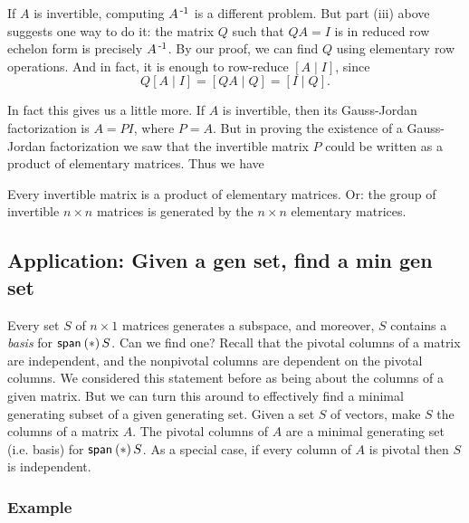 \documentclass{memoir}
\begin{document}
If $A$ is invertible, computing $A^{{\,\text{-}1}}$ is a different problem. But part (iii) above suggests one way to do it: the matrix $Q$ such that $QA = I$ is in reduced row echelon form is precisely $A^{{\,\text{-}1}}$. By our proof, we can find $Q$ using elementary row operations. And in fact, it is enough to row-reduce $[A \mid I]$, since \[ Q[A \mid I] = [QA \mid Q] = [I \mid Q]. \]

In fact this gives us a little more. If $A$ is invertible, then its Gauss-Jordan factorization is $A = PI$, where $P = A$. But in proving the existence of a Gauss-Jordan factorization we saw that the invertible matrix $P$ could be written as a product of elementary matrices. Thus we have

\begin{cor}
Every invertible matrix is a product of elementary matrices. Or: the group of invertible $n \times n$ matrices is generated by the $n \times n$ elementary matrices.
\end{cor}

\subsection*{Application: Given a gen set, find a min gen set}

Every set $S$ of $n \times 1$ matrices generates a subspace, and moreover, $S$ contains a \emph{basis} for $\operatorname{\mathsf{span}}_{}\left(*\right){S}$. Can we find one? Recall that the pivotal columns of a matrix are independent, and the nonpivotal columns are dependent on the pivotal columns. We considered this statement before as being about the columns of a given matrix. But we can turn this around to effectively find a minimal generating subset of a given generating set. Given a set $S$ of vectors, make $S$ the columns of a matrix $A$. The pivotal columns of $A$ are a minimal generating set (i.e. basis) for $\operatorname{\mathsf{span}}_{}\left(*\right){S}$. As a special case, if every column of $A$ is pivotal then $S$ is independent.

\subsubsection*{Example}
\end{document}
